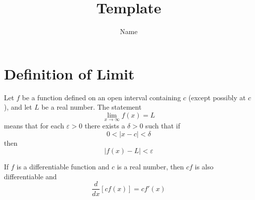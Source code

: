 



\title{Template}
\author{Name}
\date{}



\maketitle
\newpage

\section{Definition of Limit}

\begin{tcolorbox}[colframe=nord11!, title=$\varepsilon - \delta$ definition of limit]
Let $f$ be a function defined on an open interval containing $c$ (except possibly at $c$), and let $L$ be a real number. The statement
$$
\lim_{x\to\infty} f(x) = L
$$
means that for each $\varepsilon > 0$ there exists a $\delta > 0$ such that if
$$
0 < \left| x-c \right| < \delta
$$
then
$$
\left| f(x) - L \right| < \varepsilon
$$
\end{tcolorbox}

\bigskip

\begin{tcolorbox}[colframe=nord9, title=\textbf{THEOREM 2.4} The Constant Multiple Rule]
If $f$ is a differentiable function and $c$ is a real number, then $cf$ is also differentiable and
$$
\frac{d}{dx}\left[ cf(x) \right] = cf'(x)
$$


\end{tcolorbox}



